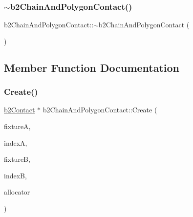 \mbox{\label{classb2_chain_and_polygon_contact_a96a50e3119cb36040f5d75ffb5a68ae9}} 
\subsubsection{\texorpdfstring{$\sim$b2ChainAndPolygonContact()}{~b2ChainAndPolygonContact()}}
{\footnotesize\ttfamily b2\+Chain\+And\+Polygon\+Contact\+::$\sim$b2\+Chain\+And\+Polygon\+Contact (\begin{DoxyParamCaption}{ }\end{DoxyParamCaption})\hspace{0.3cm}{\ttfamily [inline]}}



\subsection{Member Function Documentation}
\mbox{\label{classb2_chain_and_polygon_contact_a03e9021485104ae8f485f986703fcd85}} 
\subsubsection{\texorpdfstring{Create()}{Create()}}
{\footnotesize\ttfamily \mbox{\hyperlink{classb2_contact}{b2\+Contact}} $\ast$ b2\+Chain\+And\+Polygon\+Contact\+::\+Create (\begin{DoxyParamCaption}\item[{\mbox{\hyperlink{classb2_fixture}{b2\+Fixture}} $\ast$}]{fixtureA,  }\item[{\mbox{\hyperlink{b2_settings_8h_a43d43196463bde49cb067f5c20ab8481}{int32}}}]{indexA,  }\item[{\mbox{\hyperlink{classb2_fixture}{b2\+Fixture}} $\ast$}]{fixtureB,  }\item[{\mbox{\hyperlink{b2_settings_8h_a43d43196463bde49cb067f5c20ab8481}{int32}}}]{indexB,  }\item[{\mbox{\hyperlink{classb2_block_allocator}{b2\+Block\+Allocator}} $\ast$}]{allocator }\end{DoxyParamCaption})\hspace{0.3cm}{\ttfamily [static]}}

